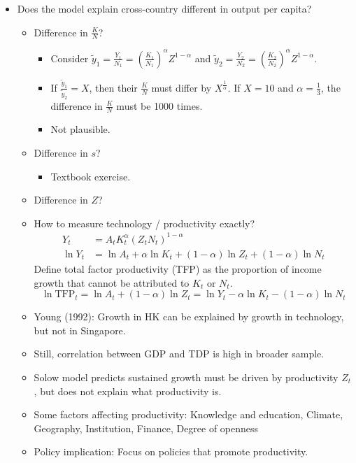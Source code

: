 \documentclass[notitlepage]{article}
\begin{document}
\begin{itemize}
\item Does the model explain cross-country different in output per capita?
\begin{itemize}
\item Difference in $\frac{K}{N}$?
\begin{itemize}
\item Consider $\tilde{y}_1 = \frac{Y_1}{N_1} = \left(\frac{K_1}{N_1}\right)^\alpha Z^{1-\alpha}$ and $\tilde{y}_2 = \frac{Y_2}{N_2} = \left(\frac{K_2}{N_2}\right)^\alpha Z^{1-\alpha}$.
\item If $\frac{\tilde{y}_1}{\tilde{y}_2} = X$, then their $\frac{K}{N}$ must differ by $X^\frac{1}{\alpha}$. If $X=10$ and $\alpha=\frac{1}{3}$, the difference in $\frac{K}{N}$ must be 1000 times.
\item Not plausible.
\end{itemize}
\item Difference in $s$?
\begin{itemize}
\item Textbook exercise.
\end{itemize}
\item Difference in $Z$?
\item How to measure technology / productivity exactly?
\begin{align*}
Y_t &= A_tK^\alpha_t(Z_tN_t)^{1-\alpha} \\
\ln Y_t &= \ln A_t + \alpha \ln K_t + (1-\alpha) \ln Z_t + (1-\alpha) \ln N_t
\end{align*}
Define total factor productivity (TFP) as the proportion of income growth that cannot be attributed to $K_t$ or $N_t$.
\[
\ln \text{TFP}_t = \ln A_t + (1-\alpha) \ln Z_t = \ln Y_t - \alpha \ln K_t - (1-\alpha) \ln N_t
\]
\item Young (1992): Growth in HK can be explained by growth in technology, but not in Singapore.
\item Still, correlation between GDP and TDP is high in broader sample.
\item Solow model predicts sustained growth must be driven by productivity $Z_t$, but does not explain what productivity is.
\item Some factors affecting productivity: Knowledge and education, Climate, Geography, Institution, Finance, Degree of openness
\item Policy implication: Focus on policies that promote productivity.
\end{itemize}
\end{itemize}
\end{document}
